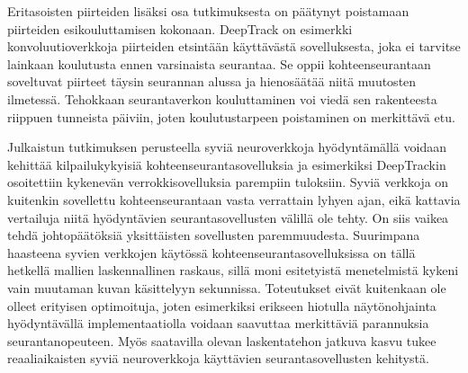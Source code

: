 Eritasoisten piirteiden lisäksi osa tutkimuksesta on päätynyt poistamaan piirteiden
esikouluttamisen kokonaan. DeepTrack on esimerkki konvoluutioverkkoja piirteiden
etsintään käyttävästä sovelluksesta, joka ei tarvitse lainkaan koulutusta ennen
varsinaista seurantaa. Se oppii kohteenseurantaan soveltuvat piirteet täysin seurannan
alussa ja hienosäätää niitä muutosten ilmetessä. Tehokkaan seurantaverkon kouluttaminen
voi viedä sen rakenteesta riippuen tunneista päiviin, joten koulutustarpeen poistaminen
on merkittävä etu.

Julkaistun tutkimuksen perusteella syviä neuroverkkoja hyödyntämällä voidaan kehittää
kilpailukykyisiä kohteenseurantasovelluksia ja esimerkiksi DeepTrackin osoitettiin
kykenevän verrokkisovelluksia parempiin tuloksiin. Syviä verkkoja on kuitenkin sovellettu
kohteenseurantaan vasta verrattain lyhyen ajan, eikä kattavia vertailuja niitä hyödyntävien
seurantasovellusten välillä ole tehty. On siis vaikea tehdä johtopäätöksiä yksittäisten
sovellusten paremmuudesta. Suurimpana haasteena syvien verkkojen käytössä kohteenseurantasovelluksissa
on tällä hetkellä mallien laskennallinen raskaus, sillä moni esitetyistä menetelmistä
kykeni vain muutaman kuvan käsittelyyn sekunnissa. Toteutukset eivät kuitenkaan ole olleet
erityisen optimoituja, joten esimerkiksi erikseen hiotulla näytönohjainta hyödyntävällä
implementaatiolla voidaan saavuttaa merkittäviä parannuksia seurantanopeuteen. Myös
saatavilla olevan laskentatehon jatkuva kasvu tukee reaaliaikaisten syviä neuroverkkoja
käyttävien seurantasovellusten kehitystä.

\renewcommand{\thesubsection}{\oldsubection}
